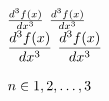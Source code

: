 $\textstyle \tfrac{d ^3f(x)}{d x^3}$ $\displaystyle \tfrac{d ^3f(x)}{d x^3}$ \\

$\textstyle \dfrac{d ^3f(x)}{d x^3}$ $\displaystyle \dfrac{d ^3f(x)}{d x^3}$ \\

\pt \\

$n \in 1, 2,\ldots, 3$ \\

 \\

 \\


